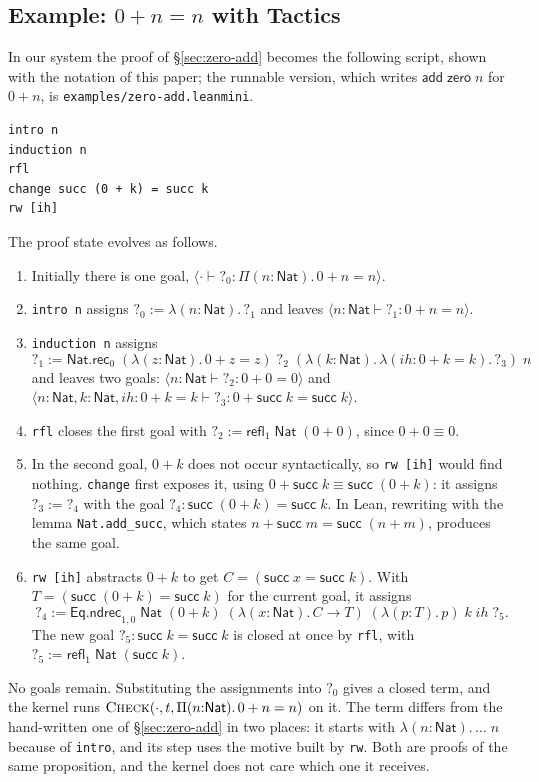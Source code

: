 \documentclass[acmsmall,screen,nonacm]{acmart}
\newcommand{\tPi}[3]{\Pi(#1{:}#2).\,#3}
\newcommand{\tLam}[3]{\lambda(#1{:}#2).\,#3}
\newcommand{\conv}{\equiv}
\newcommand{\Nat}{\mathsf{Nat}}
\newcommand{\zero}{\mathsf{zero}}
\newcommand{\tsucc}{\mathsf{succ}}
\newcommand{\add}{\mathsf{add}}
\newcommand{\NatRec}[1]{\mathsf{Nat.rec}_{#1}}
\newcommand{\refl}[1]{\mathsf{refl}_{#1}}
\newcommand{\EqRec}[1]{\mathsf{Eq.ndrec}_{#1}}
\newcommand{\hole}[1]{?_{#1}}
\begin{document}
\subsection{Example: $0 + n = n$ with Tactics}
\label{sec:zero-add-tactics}

In our system the proof of \S\ref{sec:zero-add} becomes the following script,
shown with the notation of this paper; the runnable version, which writes $\add\;\zero\;n$ for $0 + n$, is
\texttt{examples/zero-add.leanmini}.
\begin{lstlisting}[numbers=none, columns=fullflexible, keepspaces=true]
intro n
induction n
rfl
change succ (0 + k) = succ k
rw [ih]
\end{lstlisting}
The proof state evolves as follows.
\begin{enumerate}
  \item Initially there is one goal, $\langle \cdot \vdash \hole{0} : \tPi{n}{\Nat}{0 + n = n} \rangle$.
  \item \texttt{intro n} assigns $\hole{0} \mathrel{:=} \tLam{n}{\Nat}{\hole{1}}$ and leaves $\langle n : \Nat \vdash \hole{1} : 0 + n = n \rangle$.
  \item \texttt{induction n} assigns
    \[
    \hole{1} \mathrel{:=} \NatRec{0}\;(\tLam{z}{\Nat}{0 + z = z})\;\hole{2}\;(\tLam{k}{\Nat}{\tLam{\mathit{ih}}{0 + k = k}{\hole{3}}})\;n
    \]
    and leaves two goals: $\langle n : \Nat \vdash \hole{2} : 0 + 0 = 0 \rangle$ and $\langle n : \Nat, k : \Nat, \mathit{ih} : 0 + k = k \vdash \hole{3} : 0 + \tsucc\;k = \tsucc\;k \rangle$.
  \item \texttt{rfl} closes the first goal with $\hole{2} \mathrel{:=} \refl{1}\;\Nat\;(0 + 0)$, since $0 + 0 \conv 0$.
  \item In the second goal, $0 + k$ does not occur syntactically, so \texttt{rw [ih]} would find nothing.
    \texttt{change} first exposes it, using $0 + \tsucc\;k \conv \tsucc\;(0 + k)$: it assigns $\hole{3} \mathrel{:=} \hole{4}$ with the goal $\hole{4} : \tsucc\;(0 + k) = \tsucc\;k$.
    In Lean, rewriting with the lemma \texttt{Nat.add\_succ}, which states $n + \tsucc\;m = \tsucc\;(n + m)$, produces the same goal.
  \item \texttt{rw [ih]} abstracts $0 + k$ to get $C = (\tsucc\;x = \tsucc\;k)$.
    With $T = (\tsucc\;(0 + k) = \tsucc\;k)$ for the current goal, it assigns
    \[
    \hole{4} \mathrel{:=} \EqRec{1,0}\;\Nat\;(0 + k)\;(\tLam{x}{\Nat}{C \to T})\;(\tLam{p}{T}{p})\;k\;\mathit{ih}\;\hole{5}.
    \]
    The new goal $\hole{5} : \tsucc\;k = \tsucc\;k$ is closed at once by \texttt{rfl}, with $\hole{5} \mathrel{:=} \refl{1}\;\Nat\;(\tsucc\;k)$.
\end{enumerate}
No goals remain.
Substituting the assignments into $\hole{0}$ gives a closed term, and the kernel runs $\textsc{Check}(\cdot, t, \tPi{n}{\Nat}{0 + n = n})$ on it.
The term differs from the hand-written one of \S\ref{sec:zero-add} in two places:
it starts with $\tLam{n}{\Nat}{\ldots\;n}$ because of \texttt{intro}, and its step uses the motive built by \texttt{rw}.
Both are proofs of the same proposition, and the kernel does not care which one it receives.
\end{document}
